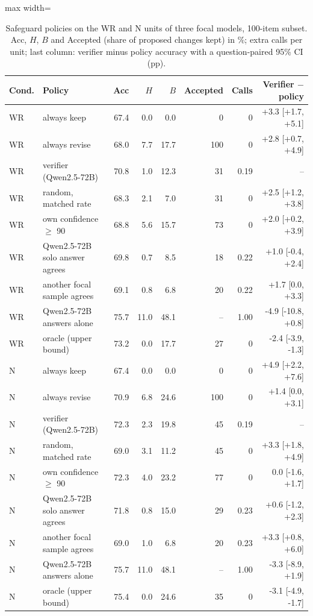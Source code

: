 \begin{table}[t]
\centering
\caption{Safeguard policies on the WR and N units of three focal models, 100-item subset. Acc, $H$, $B$ and Accepted (share of proposed changes kept) in \%; extra calls per unit; last column: verifier minus policy accuracy with a question-paired 95\% CI (pp).}
\label{tab:safeguard}
\begin{adjustbox}{max width=\textwidth}
\small
\begin{tabular}{@{}llrrrrrr@{}}
\toprule
Cond. & Policy & Acc & $H$ & $B$ & Accepted & Calls & Verifier $-$ policy \\
\midrule
WR & always keep & 67.4 & 0.0 & 0.0 & 0 & 0 & +3.3 [+1.7, +5.1] \\
WR & always revise & 68.0 & 7.7 & 17.7 & 100 & 0 & +2.8 [+0.7, +4.9] \\
WR & verifier (Qwen2.5-72B) & 70.8 & 1.0 & 12.3 & 31 & 0.19 & -- \\
WR & random, matched rate & 68.3 & 2.1 & 7.0 & 31 & 0 & +2.5 [+1.2, +3.8] \\
WR & own confidence $\geq$ 90 & 68.8 & 5.6 & 15.7 & 73 & 0 & +2.0 [+0.2, +3.9] \\
WR & Qwen2.5-72B solo answer agrees & 69.8 & 0.7 & 8.5 & 18 & 0.22 & +1.0 [-0.4, +2.4] \\
WR & another focal sample agrees & 69.1 & 0.8 & 6.8 & 20 & 0.22 & +1.7 [0.0, +3.3] \\
WR & Qwen2.5-72B answers alone & 75.7 & 11.0 & 48.1 & -- & 1.00 & -4.9 [-10.8, +0.8] \\
WR & oracle (upper bound) & 73.2 & 0.0 & 17.7 & 27 & 0 & -2.4 [-3.9, -1.3] \\
\midrule
N & always keep & 67.4 & 0.0 & 0.0 & 0 & 0 & +4.9 [+2.2, +7.6] \\
N & always revise & 70.9 & 6.8 & 24.6 & 100 & 0 & +1.4 [0.0, +3.1] \\
N & verifier (Qwen2.5-72B) & 72.3 & 2.3 & 19.8 & 45 & 0.19 & -- \\
N & random, matched rate & 69.0 & 3.1 & 11.2 & 45 & 0 & +3.3 [+1.8, +4.9] \\
N & own confidence $\geq$ 90 & 72.3 & 4.0 & 23.2 & 77 & 0 & 0.0 [-1.6, +1.7] \\
N & Qwen2.5-72B solo answer agrees & 71.8 & 0.8 & 15.0 & 29 & 0.23 & +0.6 [-1.2, +2.3] \\
N & another focal sample agrees & 69.0 & 1.0 & 6.8 & 20 & 0.23 & +3.3 [+0.8, +6.0] \\
N & Qwen2.5-72B answers alone & 75.7 & 11.0 & 48.1 & -- & 1.00 & -3.3 [-8.9, +1.9] \\
N & oracle (upper bound) & 75.4 & 0.0 & 24.6 & 35 & 0 & -3.1 [-4.9, -1.7] \\
\bottomrule
\end{tabular}
\end{adjustbox}
\end{table}
